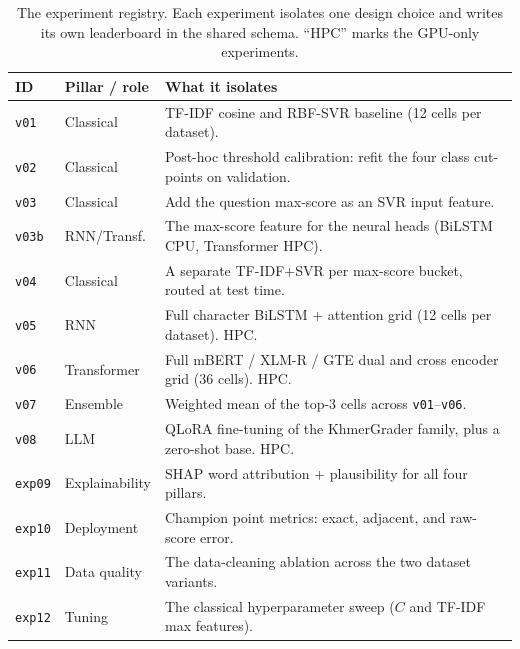 \begin{table}[t]
\centering
\caption[The experiment registry]{The experiment registry. Each experiment isolates one design choice
and writes its own leaderboard in the shared schema. ``HPC'' marks the GPU-only experiments.}
\label{tab:grid}
\footnotesize
\setlength{\tabcolsep}{4pt}
\begin{tabular}{@{}llp{8.2cm}@{}}
\toprule
ID & Pillar / role & What it isolates \\
\midrule
\texttt{v01}  & Classical    & TF-IDF cosine and RBF-SVR baseline (12 cells per dataset). \\
\texttt{v02}  & Classical    & Post-hoc threshold calibration: refit the four class cut-points on validation. \\
\texttt{v03}  & Classical    & Add the question max-score as an SVR input feature. \\
\texttt{v03b} & RNN/Transf.  & The max-score feature for the neural heads (BiLSTM CPU, Transformer HPC). \\
\texttt{v04}  & Classical    & A separate TF-IDF+SVR per max-score bucket, routed at test time. \\
\texttt{v05}  & RNN          & Full character BiLSTM + attention grid (12 cells per dataset). HPC. \\
\texttt{v06}  & Transformer  & Full mBERT / XLM-R / GTE dual and cross encoder grid (36 cells). HPC. \\
\texttt{v07}  & Ensemble     & Weighted mean of the top-3 cells across \texttt{v01}--\texttt{v06}. \\
\texttt{v08}  & LLM          & QLoRA fine-tuning of the KhmerGrader family, plus a zero-shot base. HPC. \\
\midrule
\texttt{exp09} & Explainability & SHAP word attribution + plausibility for all four pillars. \\
\texttt{exp10} & Deployment      & Champion point metrics: exact, adjacent, and raw-score error. \\
\texttt{exp11} & Data quality   & The data-cleaning ablation across the two dataset variants. \\
\texttt{exp12} & Tuning         & The classical hyperparameter sweep ($C$ and TF-IDF max features). \\
\bottomrule
\end{tabular}
\end{table}

